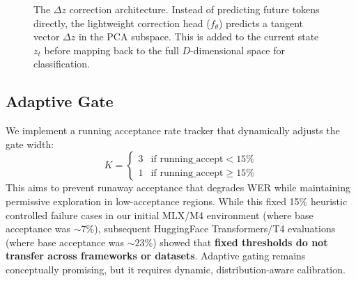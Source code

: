 \documentclass[11pt,a4paper]{article}
\begin{document}
\begin{figure}[H]
\centering
{}
\caption{The $\Delta z$ correction architecture. Instead of predicting future tokens directly, the lightweight correction head ($f_\theta$) predicts a tangent vector $\Delta z$ in the PCA subspace. This is added to the current state $z_t$ before mapping back to the full $D$-dimensional space for classification.}
\label{fig:architecture}
\end{figure}

\subsection{Adaptive Gate}

We implement a running acceptance rate tracker that dynamically adjusts the gate width:
\begin{equation}
    K = \begin{cases}
        3 & \text{if } \text{running\_accept} < 15\% \\
        1 & \text{if } \text{running\_accept} \geq 15\%
    \end{cases}
\end{equation}
This aims to prevent runaway acceptance that degrades WER while maintaining permissive exploration in low-acceptance regions.
While this fixed 15\% heuristic controlled failure cases in our initial MLX/M4 environment (where base acceptance was ${\sim}7\%$), subsequent HuggingFace Transformers/T4 evaluations (where base acceptance was ${\sim}23\%$) showed that \textbf{fixed thresholds do not transfer across frameworks or datasets}. Adaptive gating remains conceptually promising, but it requires dynamic, distribution-aware calibration.
\end{document}
